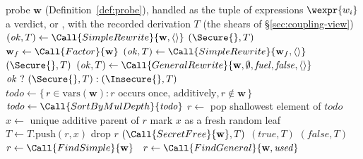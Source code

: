 \begin{algorithm}
\caption{Discharging a probe (Component I)}
\label{alg:rewrite-engine}
\small
\begin{minipage}{\linewidth}
\begin{algorithmic}[1]
  \Require probe $\mathbf{w}$ (Definition~\ref{def:probe}), handled as the tuple of expressions $\wexpr{w_i}$
  \Ensure a verdict, \Secure{} or \Insecure{}, with the recorded derivation $T$ (the shears of \S\ref{sec:coupling-view})
  \State $(\mathit{ok}, T) \gets \Call{SimpleRewrite}{\mathbf{w}, \langle\rangle}$ 
   \Return $(\Secure{}, T)$ \EndIf
  \State $\mathbf{w}_f \gets \Call{Factor}{\mathbf{w}}$ 
  \State $(\mathit{ok}, T) \gets \Call{SimpleRewrite}{\mathbf{w}_f, \langle\rangle}$ 
   \Return $(\Secure{}, T)$ \EndIf
  \State $(\mathit{ok}, T) \gets \Call{GeneralRewrite}{\mathbf{w}, \emptyset, \mathit{fuel}, \mathit{false}, \langle\rangle}$ 
  \State \Return $\mathit{ok}\ ?\ (\Secure{}, T) : (\Insecure{}, T)$
\EndFunction
\Statex
{}
  \State $\mathit{todo} \gets \{\, r \in \mathrm{vars}(\mathbf{w}) : r \text{ occurs once, additively}, r \notin \mathbf{w} \,\}$
  \State $\mathit{todo} \gets \Call{SortByMulDepth}{\mathit{todo}}$ 
    \State $r \gets$ pop shallowest element of $\mathit{todo}$
    \State $x \gets$ unique additive parent of $r$ 
    \State mark $x$ as a fresh random leaf
    \State $T \gets T.\mathrm{push}(r, x)$
    \State drop $r$ 
  \EndWhile
  \State \Return $(\Call{SecretFree}{\mathbf{w}}, T)$
\EndFunction
\Statex
{}
   \Return $(\mathit{true}, T)$ \EndIf
   \Return $(\mathit{false}, T)$ \EndIf
  \State $r \gets \Call{FindSimple}{\mathbf{w}}$ 
   \ $r \gets \Call{FindGeneral}{\mathbf{w}, \mathit{used}}$  \EndIf

\end{algorithmic}
\end{minipage}
\end{algorithm}
